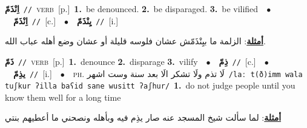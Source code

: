 \documentclass[10pt,a4paper,twoside]{article} %
\begin{document}
\begin{multicols}{2}
{\setlength\topsep{0pt}\textbf{\foreignlanguage{arabic}{اِنْذَمّ}}\ {\color{gray}\texttt{//}\color{black}}\ \textsc{verb}\ [p.]\ \textbf{1.}~be denounced.  \textbf{2.}~be disparaged.  \textbf{3.}~be vilified\ \ $\bullet$\ \ \setlength\topsep{0pt}\textbf{\foreignlanguage{arabic}{اِنْذَمّ}}\ {\color{gray}\texttt{//}\color{black}}\ [c.]\ \ $\bullet$\ \ \setlength\topsep{0pt}\textbf{\foreignlanguage{arabic}{يِنْذَمّ}}\ {\color{gray}\texttt{//}\color{black}}\ [i.]\  \begin{flushright}\color{gray}\foreignlanguage{arabic}{\textbf{\underline{\foreignlanguage{arabic}{أمثلة}}}: الزلمة ما بيِنْذَمّش عشان فلوسه قليلة أو عشان وضع أهله عباب الله.}\end{flushright}\color{black}} \vspace{2mm}

{\setlength\topsep{0pt}\textbf{\foreignlanguage{arabic}{ذَمّ}}\ {\color{gray}\texttt{//}\color{black}}\ \textsc{verb}\ [p.]\ \textbf{1.}~denounce  \textbf{2.}~disparage  \textbf{3.}~vilify\ \ $\bullet$\ \ \setlength\topsep{0pt}\textbf{\foreignlanguage{arabic}{ذِمّ}}\ {\color{gray}\texttt{//}\color{black}}\ [c.]\ \ $\bullet$\ \ \setlength\topsep{0pt}\textbf{\foreignlanguage{arabic}{يذِمّ}}\ {\color{gray}\texttt{//}\color{black}}\ [i.]\ \ $\bullet$\ \ \textsc{ph.} \color{gray} \foreignlanguage{arabic}{لَا تذم ولَا تشكر الَا بعد سنة وست اشهر}\color{black}\ {\color{gray}\texttt{/{\sffamily laː t(ð)imm wala tuʃkur ʔilla baʕid sane wusitt ʔaʃhur}/}\color{black}}\ \textbf{1.}~do not judge people until you know them well for a long time\  \begin{flushright}\color{gray}\foreignlanguage{arabic}{\textbf{\underline{\foreignlanguage{arabic}{أمثلة}}}: لما سألت شيخ المسجد عنه صار يذِم فيه وبأهله ونصحني ما أعطيهم بنتي}\end{flushright}\color{black}} \vspace{2mm}


\end{multicols}
\end{document}
